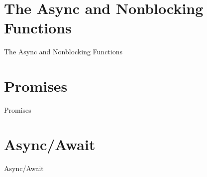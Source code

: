 \documentclass[handout, 14pt]{beamer}
\begin{document}
\def\name{The Async and Nonblocking Functions}
\section[Nonblocking]{\name}
\begin{frame}[fragile]{}%
\begin{center}%
%
%
\name
\end{center}%
\end{frame}


\def\name{Promises}
\section{\name}
\begin{frame}[fragile]{}%
\begin{center}%
%
%
\name
\end{center}%
\end{frame}


\def\name{Async/Await}
\section{\name}
\begin{frame}[fragile]{}%
\begin{center}%
%
%
\name
\end{center}%
\end{frame}
 
\end{document}
